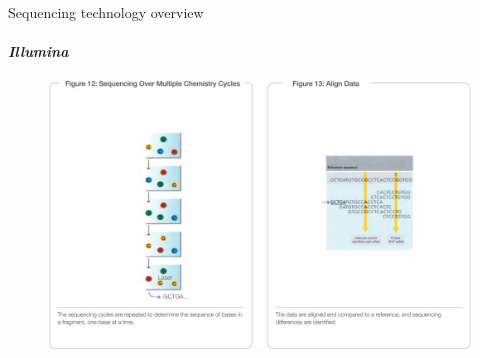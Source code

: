 \documentclass{if-beamer}
\begin{document}
\begin{frame}{Sequencing technology overview}
\framesubtitle{\emph{Illumina}}
\begin{figure}
\centering
\includegraphics[scale=0.2]{illumina6.jpg}
\end{figure}
\end{frame}
\end{document}
